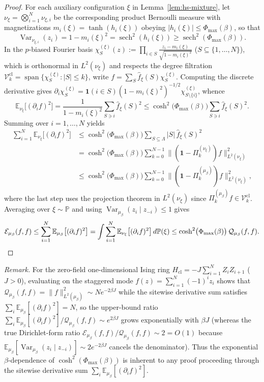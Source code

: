 \documentclass[11pt,a4paper]{article}
\numberwithin{equation}{section}
\theoremstyle{plain}
\theoremstyle{definition}
\newcommand{\Var}{\operatorname{Var}}
\newcommand{\sech}{\operatorname{sech}}
\newcommand{\E}{\mathbb{E}}
\begin{document}
\begin{proof}
For each auxiliary configuration $\xi$ in Lemma~\ref{lem:hs-mixture}, let $\nu_\xi = \bigotimes_{i=1}^N \nu_{\xi,i}$ be the corresponding product Bernoulli measure with magnetizations $m_i(\xi) = \tanh(h_i(\xi))$ obeying $|h_i(\xi)| \le \Phi_{\max}(\beta)$, so that
\[
  \Var_{\nu_{\xi,i}}(z_i) = 1 - m_i(\xi)^2 = \sech^2(h_i(\xi)) \ge \sech^2(\Phi_{\max}(\beta)).
\]
In the $p$-biased Fourier basis $\chi_S^{(\xi)}(z) := \prod_{i\in S} \frac{z_i - m_i(\xi)}{\sqrt{1-m_i(\xi)^2}}$ ($S\subseteq\{1,\dots,N\}$), which is orthonormal in $L^2(\nu_\xi)$ and respects the degree filtration $\mathcal{V}_k^{\mathrm{cl}} = \operatorname{span}\{\chi_S^{(\xi)} : |S|\le k\}$, write $f = \sum_S \widehat{f}_\xi(S)\chi_S^{(\xi)}$. Computing the discrete derivative gives $\partial_i\chi_S^{(\xi)} = \mathbf{1}(i\in S)(1-m_i(\xi)^2)^{-1/2}\chi_{S\setminus\{i\}}^{(\xi)}$, whence
\[
  \E_{\nu_\xi}\bigl[(\partial_i f)^2\bigr]
  = \frac{1}{1-m_i(\xi)^2}\sum_{S\ni i}\widehat{f}_\xi(S)^2
  \le \cosh^2\bigl(\Phi_{\max}(\beta)\bigr)\sum_{S\ni i}\widehat{f}_\xi(S)^2.
\]
Summing over $i=1,\dots,N$ yields
\begin{align*}
  \sum_{i=1}^N \E_{\nu_\xi}\bigl[(\partial_i f)^2\bigr]
  &\le \cosh^2\bigl(\Phi_{\max}(\beta)\bigr)\sum_{S\subseteq\Lambda} |S|\,\widehat{f}_\xi(S)^2 \\
  &= \cosh^2\bigl(\Phi_{\max}(\beta)\bigr)\sum_{k=0}^{N-1}\bigl\|(\mathbf{1}-\Pi_k^{(\nu_\xi)})f\bigr\|_{L^2(\nu_\xi)}^2 \\
  &\le \cosh^2\bigl(\Phi_{\max}(\beta)\bigr)\sum_{k=0}^{N-1}\bigl\|(\mathbf{1}-\Pi_k^{(\mu_\beta)})f\bigr\|_{L^2(\nu_\xi)}^2,
\end{align*}
where the last step uses the projection theorem in $L^2(\nu_\xi)$ since $\Pi_k^{(\mu_\beta)}f\in\mathcal{V}_k^{\mathrm{cl}}$. Averaging over $\xi\sim\mathbb{P}$ and using $\Var_{\mu_\beta}(z_i\mid z_{-i})\le 1$ gives
\[
  \mathcal{E}_{\mu_\beta}(f,f)
  \le \sum_{i=1}^N \E_{\mu_\beta}\bigl[(\partial_i f)^2\bigr]
  = \int \sum_{i=1}^N \E_{\nu_\xi}\bigl[(\partial_i f)^2\bigr]\,d\mathbb{P}(\xi)
  \le \cosh^2\bigl(\Phi_{\max}(\beta)\bigr)\,\mathcal{Q}_{\mu_\beta}(f,f). \qedhere
\]
\end{proof}

\noindent\emph{Remark.}
For the zero-field one-dimensional Ising ring $H_{\mathrm{cl}} = -J\sum_{i=1}^N Z_i Z_{i+1}$ ($J>0$), evaluating on the staggered mode $f(z) = \sum_{i=1}^N (-1)^i z_i$ shows that $\mathcal{Q}_{\mu_\beta}(f,f) = \|f\|_{L^2(\mu_\beta)}^2 \sim N e^{-2\beta J}$ while the sitewise derivative sum satisfies $\sum_i \E_{\mu_\beta}[(\partial_i f)^2] = N$, so the upper-bound ratio $\sum_i\E_{\mu_\beta}[(\partial_i f)^2]/\mathcal{Q}_{\mu_\beta}(f,f) \sim e^{2\beta J}$ grows exponentially with $\beta J$ (whereas the true Dirichlet-form ratio $\mathcal{E}_{\mu_\beta}(f,f)/\mathcal{Q}_{\mu_\beta}(f,f) \sim 2 = O(1)$ because $\E_{\mu_\beta}[\Var_{\mu_\beta}(z_i\mid z_{-i})] \sim 2e^{-2\beta J}$ cancels the denominator). Thus the exponential $\beta$-dependence of $\cosh^2(\Phi_{\max}(\beta))$ is inherent to any proof proceeding through the sitewise derivative sum $\sum_i\E_{\mu_\beta}[(\partial_i f)^2]$.
\end{document}

